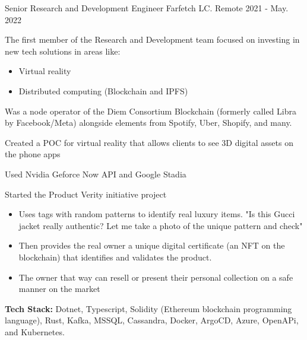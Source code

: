 \begin{cventries}
  \cventry
    {Senior Research and Development Engineer} %
    {Farfetch LC.} %
    {Remote} %
    {2021 - May. 2022} %
    {
      \begin{cvitems} %
        \item {The first member of the Research and Development team focused on investing in new tech solutions in areas like:}
        \begin{itemize}
         \item Virtual reality
         \item Distributed computing (Blockchain and IPFS)
        \end{itemize}
        \item {Was a node operator of the Diem Consortium Blockchain (formerly called Libra by Facebook/Meta) alongside elements from Spotify, Uber, Shopify, and many.}
        \item {Created a POC for virtual reality that allows clients to see 3D digital assets on the phone apps}
        \item {Used Nvidia Geforce Now API and Google Stadia}
        \item {Started the Product Verity initiative project}
        \begin{itemize}
         \item Uses tags with random patterns to identify real luxury items. "Is this Gucci jacket really authentic? Let me take a photo of the unique pattern and check"
         \item Then provides the real owner a unique digital certificate (an NFT on the blockchain) that identifies and validates the product.
         \item The owner that way can resell or present their personal collection on a safe manner on the market
        \end{itemize}
        \item {\textbf{Tech Stack:} Dotnet, Typescript, Solidity (Ethereum blockchain programming language), Rust, Kafka, MSSQL, Cassandra, Docker, ArgoCD, Azure, OpenAPi, and Kubernetes.}
      \end{cvitems}
    }


\end{cventries}
